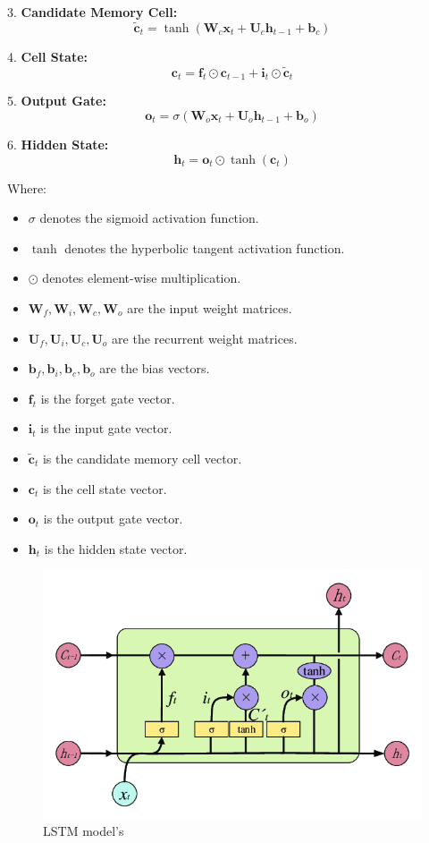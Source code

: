 \documentclass{ieeeojies}
\begin{document}
3. \textbf{Candidate Memory Cell:}
\[
\mathbf{\tilde{c}}_t = \tanh(\mathbf{W}_c \mathbf{x}_t + \mathbf{U}_c \mathbf{h}_{t-1} + \mathbf{b}_c)
\]

4. \textbf{Cell State:}
\[
\mathbf{c}_t = \mathbf{f}_t \odot \mathbf{c}_{t-1} + \mathbf{i}_t \odot \mathbf{\tilde{c}}_t
\]

5. \textbf{Output Gate:}
\[
\mathbf{o}_t = \sigma(\mathbf{W}_o \mathbf{x}_t + \mathbf{U}_o \mathbf{h}_{t-1} + \mathbf{b}_o)
\]

6. \textbf{Hidden State:}
\[
\mathbf{h}_t = \mathbf{o}_t \odot \tanh(\mathbf{c}_t)
\]

Where:
\begin{itemize}
    \item $\sigma$ denotes the sigmoid activation function.
    \item $\tanh$ denotes the hyperbolic tangent activation function.
    \item $\odot$ denotes element-wise multiplication.
    \item $\mathbf{W}_f, \mathbf{W}_i, \mathbf{W}_c, \mathbf{W}_o$ are the input weight matrices.
    \item $\mathbf{U}_f, \mathbf{U}_i, \mathbf{U}_c, \mathbf{U}_o$ are the recurrent weight matrices.
    \item $\mathbf{b}_f, \mathbf{b}_i, \mathbf{b}_c, \mathbf{b}_o$ are the bias vectors.
    \item $\mathbf{f}_t$ is the forget gate vector.
    \item $\mathbf{i}_t$ is the input gate vector.
    \item $\mathbf{\tilde{c}}_t$ is the candidate memory cell vector.
    \item $\mathbf{c}_t$ is the cell state vector.
    \item $\mathbf{o}_t$ is the output gate vector.
    \item $\mathbf{h}_t$ is the hidden state vector.
\end{itemize}

\begin{figure}[H]
  \centering
  \begin{minipage}{0.8\linewidth}
    \centering
    \includegraphics[width=\linewidth]{bibliography/Figure/LSTM_model.png}
    \caption{LSTM model's}
    \label{fig8}
  \end{minipage}
\end{figure}
\end{document}
